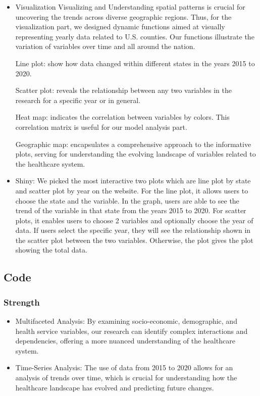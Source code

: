 \documentclass{article}
\begin{document}
\begin{itemize}
    \item Visualization
    Visualizing and Understanding spatial patterns is crucial for uncovering the trends across diverse geographic regions. Thus, for the visualization part, we designed dynamic functions aimed at visually representing yearly data related to U.S. counties. Our functions illustrate the variation of variables over time and all around the nation. 

        Line plot: show how data changed within different states in the years 2015 to 2020. 
        
        Scatter plot: reveals the relationship between any two variables in the research for a specific year or in general.
        
        Heat map: indicates the correlation between variables by colors. This correlation matrix is useful for our model analysis part. 
        
        Geographic map: encapsulates a comprehensive approach to the informative plots, serving for understanding the evolving landscape of variables related to the healthcare system.
        

    \item Shiny: We picked the most interactive two plots which are line plot by state and scatter plot by year on the website. For the line plot, it allows users to choose the state and the variable. In the graph, users are able to see the trend of the variable in that state from the years 2015 to 2020. For scatter plots, it enables users to choose 2 variables and optionally choose the year of data. If users select the specific year, they will see the relationship shown in the scatter plot between the two variables. Otherwise, the plot gives the plot showing the total data. 
    
\end{itemize}
\subsection{Code}
\subsubsection{Strength}
\begin{itemize}
    \item {Multifaceted Analysis: By examining socio-economic, demographic, and health service variables, our research can identify complex interactions and dependencies, offering a more nuanced understanding of the healthcare system.}
    \item {Time-Series Analysis: The use of data from 2015 to 2020 allows for an analysis of trends over time, which is crucial for understanding how the healthcare landscape has evolved and predicting future changes.}
\end{itemize}
\end{document}
